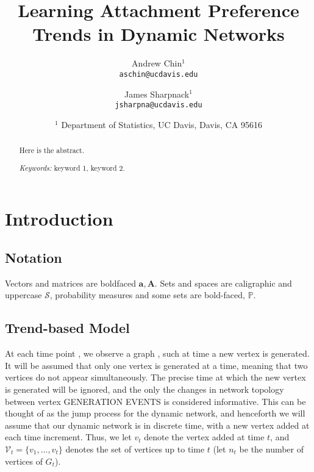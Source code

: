 \documentclass[twoside,11pt]{article}
\newcommand{\pp}{\mathbb} %
\newcommand{\cc}{\mathcal} %
\newcommand{\teq}[1]{\smash{$#1$}}
\begin{document}
\title{Learning Attachment Preference Trends in Dynamic Networks}
\author{
Andrew Chin$^{1}$\\
{\tt aschin@ucdavis.edu}\\
\and
James Sharpnack$^{1}$ \\
{\tt  jsharpna@ucdavis.edu} \\
\and
\begin{tabular}{c}
  $^{1}$ Department of Statistics, UC Davis, Davis, CA 95616\\
\end{tabular}
}

\date{}%
\maketitle

\begin{abstract}
Here is the abstract.

\medskip\noindent
{\em Keywords:} keyword 1, keyword 2.
\end{abstract}


\section{Introduction}
\label{sec:intro}

\subsection{Notation}
Vectors and matrices are boldfaced $\bm a, \bm A$.
Sets and spaces are caligraphic and uppercase $\cc S$, probability measures and some sets are bold-faced, $\pp P$.

\subsection{Trend-based Model}

At each time point \teq t, we observe a graph \teq{G_t}, such at time \teq t a new vertex is generated.
It will be assumed that only one vertex is generated at a time, meaning that two vertices do not appear simultaneously.
The precise time at which the new vertex is generated will be ignored, and the only the changes in network topology  between vertex GENERATION EVENTS is considered informative.
This can be thought of as the jump process for the dynamic network, and henceforth we will assume that our dynamic network is in discrete time, with a new vertex added at each time increment.
Thus, we let $v_t$ denote the vertex added at time $t$, and $\cc V_{t} = \{v_1,\ldots,v_t \}$ denotes the set of vertices up to time $t$ (let $n_t$ be the number of vertices of $G_t$).
\end{document}
